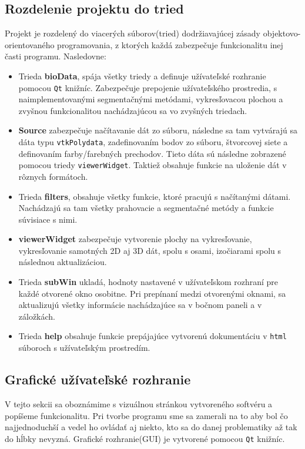 \documentclass[a4paper,11pt,oneside]{article}%
\begin{document}
\subsection{Rozdelenie projektu do tried}

Projekt je rozdelený do viacerých súborov(tried) dodržiavajúcej zásady objektovo-orientovaného programovania, z ktorých každá zabezpečuje funkcionalitu inej časti programu. Nasledovne:

\begin{itemize}
\item Trieda \textbf{bioData}, spája všetky triedy a definuje užívateľské rozhranie pomocou \texttt{Qt} knižníc. Zabezpečuje prepojenie užívateľského prostredia, s naimplementovanými segmentačnými metódami, vykresľovacou plochou a zvyšnou funkcionalitou nachádzajúcou sa vo zvyšných triedach. 
\item \textbf{Source} zabezpečuje načítavanie dát zo súboru, následne sa tam vytvárajú sa dáta typu \texttt{vtkPolydata}, zadefinovaním bodov zo súboru, štvorcovej siete a definovaním farby/farebných prechodov. Tieto dáta sú následne zobrazené pomocou triedy \texttt{viewerWidget}. Taktiež obsahuje funkcie na uloženie dát v rôznych formátoch.    
\item Trieda \textbf{filters}, obsahuje všetky funkcie, ktoré pracujú s načítanými dátami. Nachádzajú sa tam všetky prahovacie a segmentačné metódy a funkcie súvisiace s nimi.
\item \textbf{viewerWidget} zabezpečuje vytvorenie plochy na vykresľovanie, vykresľovanie samotných 2D aj 3D dát, spolu s osami, izočiarami spolu s následnou aktualizáciou. 
\item Trieda \textbf{subWin} ukladá, hodnoty nastavené v užívateľskom rozhraní pre každé otvorené okno osobitne. Pri prepínaní medzi otvorenými oknami, sa aktualizujú všetky informácie nachádzajúce sa v bočnom paneli a v záložkách. 
\item Trieda \textbf{help} obsahuje funkcie prepájajúce vytvorenú dokumentáciu v \texttt{html} súboroch s užívateľským prostredím.
\end{itemize}

\subsection{Grafické užívateľské rozhranie}

V tejto sekcii sa oboznámime s vizuálnou stránkou vytvoreného softvéru a popíšeme funkcionalitu. Pri tvorbe programu sme sa zamerali na to aby bol čo najjednoduchší a vedel ho ovládať aj niekto, kto sa do danej problematiky až tak do hĺbky nevyzná. Grafické rozhranie(GUI) je vytvorené pomocou \texttt{Qt} knižníc.
\end{document}
